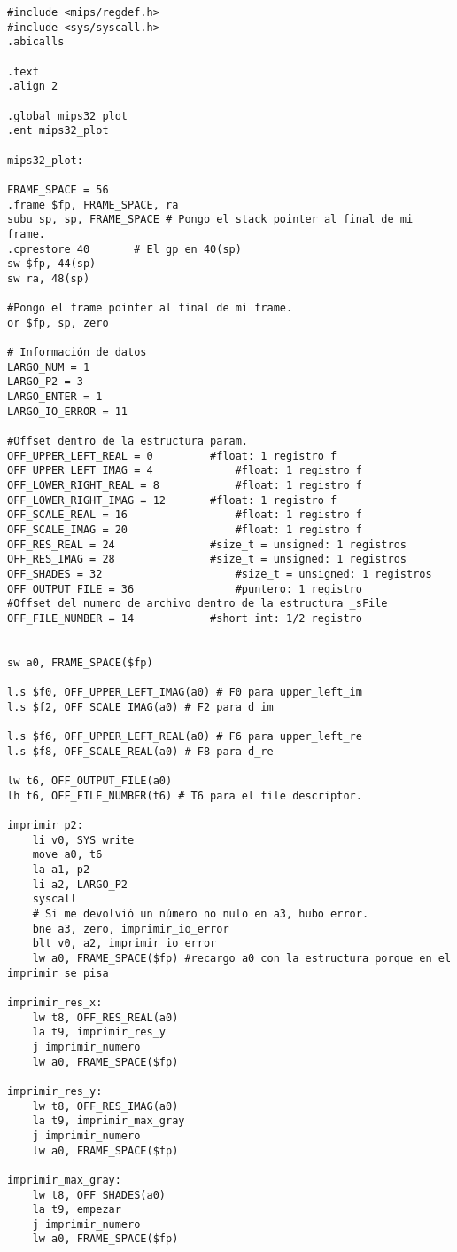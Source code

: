 \documentclass[a4paper,10pt]{article}
\begin{document}
\begin{verbatim}
#include <mips/regdef.h>
#include <sys/syscall.h>
.abicalls

.text
.align 2

.global mips32_plot
.ent mips32_plot

mips32_plot:

FRAME_SPACE = 56
.frame $fp, FRAME_SPACE, ra
subu sp, sp, FRAME_SPACE # Pongo el stack pointer al final de mi frame.
.cprestore 40		# El gp en 40(sp)
sw $fp, 44(sp)
sw ra, 48(sp)

#Pongo el frame pointer al final de mi frame.
or $fp, sp, zero

# Información de datos
LARGO_NUM = 1
LARGO_P2 = 3
LARGO_ENTER = 1
LARGO_IO_ERROR = 11

#Offset dentro de la estructura param.
OFF_UPPER_LEFT_REAL = 0			#float: 1 registro f
OFF_UPPER_LEFT_IMAG = 4 			#float: 1 registro f
OFF_LOWER_RIGHT_REAL = 8 			#float: 1 registro f
OFF_LOWER_RIGHT_IMAG = 12 		#float: 1 registro f
OFF_SCALE_REAL = 16 				#float: 1 registro f
OFF_SCALE_IMAG = 20 				#float: 1 registro f
OFF_RES_REAL = 24 				#size_t = unsigned: 1 registros
OFF_RES_IMAG = 28 				#size_t = unsigned: 1 registros
OFF_SHADES = 32 					#size_t = unsigned: 1 registros
OFF_OUTPUT_FILE = 36 				#puntero: 1 registro
#Offset del numero de archivo dentro de la estructura _sFile
OFF_FILE_NUMBER = 14 			#short int: 1/2 registro


sw a0, FRAME_SPACE($fp)

l.s $f0, OFF_UPPER_LEFT_IMAG(a0) # F0 para upper_left_im
l.s $f2, OFF_SCALE_IMAG(a0) # F2 para d_im

l.s $f6, OFF_UPPER_LEFT_REAL(a0) # F6 para upper_left_re
l.s $f8, OFF_SCALE_REAL(a0) # F8 para d_re

lw t6, OFF_OUTPUT_FILE(a0)
lh t6, OFF_FILE_NUMBER(t6) # T6 para el file descriptor.

imprimir_p2:
	li v0, SYS_write
	move a0, t6
	la a1, p2
	li a2, LARGO_P2
	syscall
	# Si me devolvió un número no nulo en a3, hubo error.
	bne a3, zero, imprimir_io_error
  	blt v0, a2, imprimir_io_error
	lw a0, FRAME_SPACE($fp) #recargo a0 con la estructura porque en el imprimir se pisa

imprimir_res_x:
	lw t8, OFF_RES_REAL(a0)
	la t9, imprimir_res_y
	j imprimir_numero
	lw a0, FRAME_SPACE($fp)
	
imprimir_res_y:
	lw t8, OFF_RES_IMAG(a0)
	la t9, imprimir_max_gray
	j imprimir_numero
	lw a0, FRAME_SPACE($fp)
	
imprimir_max_gray:
	lw t8, OFF_SHADES(a0)
	la t9, empezar
	j imprimir_numero
	lw a0, FRAME_SPACE($fp)


\end{verbatim}
\end{document}
